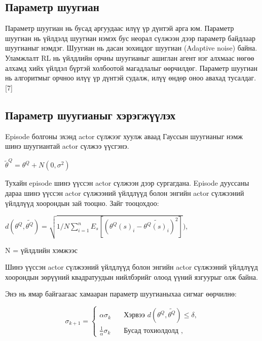 \documentclass[12pt,A4]{report}
\begin{document}
\subsection{Параметр шуугиан}
 
Параметр шуугиан нь бусад аргуудаас илүү үр дүнтэй арга юм. Параметр шуугиан нь үйлдэлд шуугиан нэмэх бус неорал сүлжээн дээр параметр байдлаар шуугианыг нэмдэг. Шуугиан нь дасан зохицдог шуугиан (Adaptive noise) байна. Уламжлалт RL нь үйлдлийн орчны шуугианыг ашиглан агент нэг алхмаас нөгөө алхамд хийх үйлдэл бүртэй холбоотой магадлалыг өөрчилдөг. Параметр шуугиан нь алгоритмыг орчноо илүү үр дүнтэй судалж, илүү өндөр оноо авахад тусалдаг. [7]

\subsection{Параметр шуугианыг хэрэгжүүлэх}

Episode болгоны эхэнд actor сүлжээг хуулж аваад Гауссын шуугианыг нэмж шинэ шуугиантай actor сүлжээ үүсгэнэ.

\begin{center}
$\tilde{\theta}^Q=\theta^Q+N(0, \sigma^2)$
\end{center}

Тухайн episode шинэ үүссэн actor сүлжээн дээр сургагдана. Episode дууссаны дараа шинэ үүссэн actor сүлжээний үйлдлүүд болон энгийн actor сүлжээний үйлдлүүд хоорондын зай тооцно. Зайг тооцохдоо:

\begin{center}

$d(\theta^Q, \tilde{\theta^Q})=\sqrt{1/N\sum_{i=1}^{n}E_s[(\theta^Q(s)_i-\tilde{\theta^Q(s)_i})^2]}),$

\end{center}

N = үйлдлийн хэмжээс

Шинэ үүссэн actor сүлжээний үйлдлүүд болон энгийн actor сүлжээний үйлдлүүд хоорондын зөрүүний квадратуудын нийлбэрийг олоод үүний язгуурыг олж байна.

Энэ нь ямар байгаагаас хамааран параметр шуугианыхаа сигмаг өөрчилнө:

\begin{center}
\[ \sigma_{k+1} =
  \begin{cases}
    \alpha\sigma_k       & \quad \text{Хэрвээ } d(\theta^Q, \tilde{\theta^Q})\leq\delta,\\
    \frac{1}{\alpha}\sigma_k  & \quad \text{Бусад тохиолдолд },
  \end{cases}
\]
\end{center}
\end{document}
